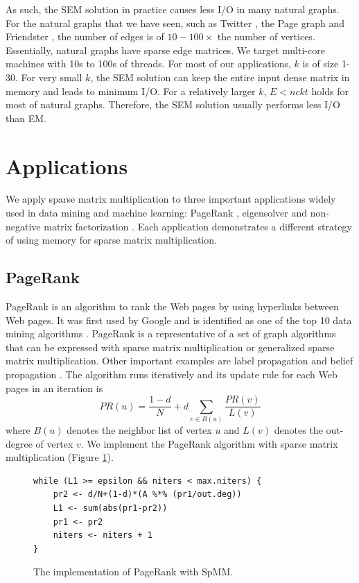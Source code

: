 As such, the SEM solution in practice causes less I/O in many natural graphs.
For the natural graphs that we have seen, such as Twitter \cite{twitter},
the Page graph \cite{web_graph} and Friendster \cite{friendster}, the number
of edges is of $10-100 \times$ the number of vertices. Essentially,
natural graphs have sparse edge matrices. We target multi-core machines with
10s to 100s of threads. For most of our applications, $k$ is of size 1-30.
For very small $k$, the SEM
solution can keep the entire input dense matrix in memory and leads to minimum
I/O. For a relatively larger $k$, $E < n c k t$ holds
for most of natural graphs. Therefore, the SEM solution usually performs less
I/O than EM.

\section{Applications} \label{sec:apps}
We apply sparse matrix multiplication to three important applications widely
used in data mining and machine learning: PageRank \cite{pagerank},
eigensolver \cite{anasazi} and non-negative matrix factorization \cite{nmf}.
Each application demonstrates a different strategy of using memory for sparse
matrix multiplication.

\subsection{PageRank} \label{sec:pagerank}
PageRank is an algorithm to rank the Web pages by using hyperlinks between Web
pages. It was first used by Google and is identified as one of the top 10 data
mining algorithms \cite{top10}. PageRank is a representative of a set of graph
algorithms that can be expressed with sparse matrix multiplication or generalized
sparse matrix multiplication. Other important examples are label propagation
\cite{label_prop} and belief propagation \cite{Yedidia03}. The algorithm runs
iteratively and its update rule for each Web pages in an iteration is
\begin{equation*}
PR(u) = \frac{1-d}{N} + d \sum\limits_{v \in B(u)} \frac{PR(v)}{L(v)}
\end{equation*}
where $B(u)$ denotes the neighbor list of vertex $u$ and $L(v)$ denotes
the out-degree of vertex $v$. We implement the PageRank algorithm with sparse
matrix multiplication (Figure \ref{code:pagerank}).


\begin{figure}
\centering
\begin{lstlisting}
while (L1 >= epsilon && niters < max.niters) {
	pr2 <- d/N+(1-d)*(A %*% (pr1/out.deg))
	L1 <- sum(abs(pr1-pr2))
	pr1 <- pr2
	niters <- niters + 1
}
\end{lstlisting}
\caption{The implementation of PageRank with SpMM.}
\label{code:pagerank}
\end{figure}

